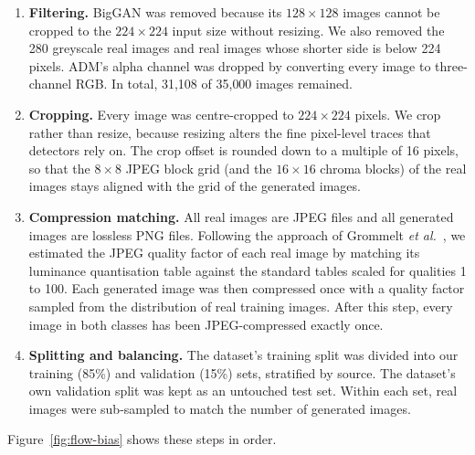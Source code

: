 \documentclass{mnnit}
\begin{document}
\begin{enumerate}
  \item \textbf{Filtering.} BigGAN was removed because its
        $128\times128$ images cannot be cropped to the $224\times224$
        input size without resizing. We also removed the 280 greyscale
        real images and real images whose shorter side is below 224
        pixels. ADM's alpha channel was dropped by converting every image
        to three-channel RGB. In total, 31{,}108 of 35{,}000 images
        remained.
  \item \textbf{Cropping.} Every image was centre-cropped to
        $224\times224$ pixels. We crop rather than resize, because
        resizing alters the fine pixel-level traces that detectors rely
        on. The crop offset is rounded down to a multiple of 16 pixels,
        so that the $8\times8$ JPEG block grid (and the $16\times16$
        chroma blocks) of the real images stays aligned with the grid of
        the generated images.
  \item \textbf{Compression matching.} All real images are JPEG files and
        all generated images are lossless PNG files. Following the
        approach of Grommelt \emph{et al.}~\cite{grommelt2024fake}, we
        estimated the JPEG quality factor of each real image by matching
        its luminance quantisation table against the standard tables
        scaled for qualities 1 to 100. Each generated image was then
        compressed once with a quality factor sampled from the
        distribution of real training images. After this step, every image
        in both classes has been JPEG-compressed exactly once.
  \item \textbf{Splitting and balancing.} The dataset's training split
        was divided into our training (85\%) and validation (15\%) sets,
        stratified by source. The dataset's own validation split was kept
        as an untouched test set. Within each set, real images were
        sub-sampled to match the number of generated images.
\end{enumerate}

Figure~\ref{fig:flow-bias} shows these steps in order.
\end{document}
